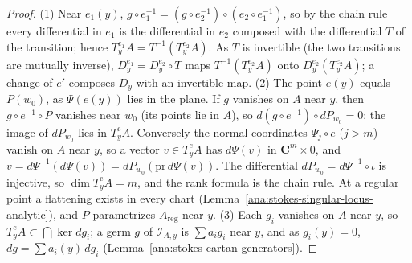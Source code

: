 \begin{proof}
\leanok
(1) Near \(e_1(y)\), \(g\circ e_1^{-1}=(g\circ e_2^{-1})\circ(e_2\circ e_1^{-1})\), so by the chain rule every differential in \(e_1\) is the differential in \(e_2\)
composed with the differential \(T\) of the transition; hence \(T^{e_1}_yA=T^{-1}(T^{e_2}_yA)\). As \(T\) is invertible (the two transitions are mutually
inverse), \(D^{e_1}_y=D^{e_2}_y\circ T\) maps \(T^{-1}(T^{e_2}_yA)\) onto \(D^{e_2}_y(T^{e_2}_yA)\); a change of \(e'\) composes \(D_y\) with an invertible
map. (2) The point \(e(y)\) equals \(P(w_0)\), as \(\Psi(e(y))\) lies in the plane. If \(g\) vanishes on \(A\) near \(y\), then \(g\circ e^{-1}\circ P\) vanishes near \(w_0\)
(its points lie in \(A\)), so \(d(g\circ e^{-1})\circ dP_{w_0}=0\): the image of \(dP_{w_0}\) lies in \(T^e_yA\). Conversely the normal coordinates
\(\Psi_j\circ e\) (\(j>m\)) vanish on \(A\) near \(y\), so a vector \(v\in T^e_yA\) has \(d\Psi(v)\) in \(\mathbf C^m\times0\), and
\(v=d\Psi^{-1}(d\Psi(v))=dP_{w_0}(\mathrm{pr}\,d\Psi(v))\). The differential \(dP_{w_0}=d\Psi^{-1}\circ\iota\) is injective, so \(\dim T^e_yA=m\), and the rank
formula is the chain rule. At a regular point a flattening exists in every chart (Lemma~\ref{ana:stokes-singular-locus-analytic}), and \(P\) parametrizes
\(A_{\mathrm{reg}}\) near \(y\). (3) Each \(g_i\) vanishes on \(A\) near \(y\), so \(T^e_yA\subset\bigcap\ker dg_i\); a germ \(g\) of \(\mathcal I_{A,y}\) is
\(\sum a_ig_i\) near \(y\), and as \(g_i(y)=0\), \(dg=\sum a_i(y)\,dg_i\) (Lemma~\ref{ana:stokes-cartan-generators}).
\end{proof}

